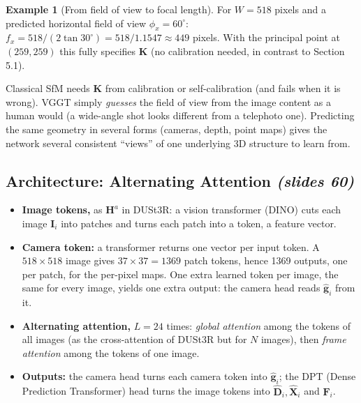 \documentclass[11pt,a4paper]{article}
\newcommand{\slr}[1]{\texorpdfstring{\emph{(slides #1)}}{(slides #1)}}
\theoremstyle{definition}
\newtheorem{example}[definition]{Example}
\theoremstyle{plain}
\theoremstyle{remark}
\begin{document}
\begin{example}[From field of view to focal length]\label{ex:fov}
For $W=518$ pixels and a predicted horizontal field of view $\phi_x=60^\circ$: $f_x=518/(2\tan30^\circ)=518/1.1547\approx449$ pixels. With the principal point at $(259,259)$ this fully specifies $\bm K$ (no calibration needed, in contrast to Section 5.1).
\end{example}

\begin{intuition}
Classical SfM needs $\bm K$ from calibration or self-calibration (and fails when it is wrong). VGGT simply \emph{guesses} the field of view from the image content as a human would (a wide-angle shot looks different from a telephoto one). Predicting the same geometry in several forms (cameras, depth, point maps) gives the network several consistent ``views'' of one underlying 3D structure to learn from.
\end{intuition}

\subsection{Architecture: Alternating Attention \slr{60}}
\begin{itemize}
\item \textbf{Image tokens,} as $\bm H^a$ in DUSt3R: a vision transformer (DINO) cuts each image $\bm I_i$ into patches and turns each patch into a token, a feature vector.
\item \textbf{Camera token:} a transformer returns one vector per input token. A $518\times518$ image gives $37\times37=1369$ patch tokens, hence 1369 outputs, one per patch, for the per-pixel maps. One extra learned token per image, the same for every image, yields one extra output: the camera head reads $\hat{\bm g}_i$ from it.
\item \textbf{Alternating attention,} $L=24$ times: \emph{global attention} among the tokens of all images (as the cross-attention of DUSt3R but for $N$ images), then \emph{frame attention} among the tokens of one image.
\item \textbf{Outputs:} the camera head turns each camera token into $\hat{\bm g}_i$; the DPT (Dense Prediction Transformer) head turns the image tokens into $\hat{\bm D}_i,\hat{\bm X}_i$ and $\bm F_i$.
\end{itemize}
\end{document}

